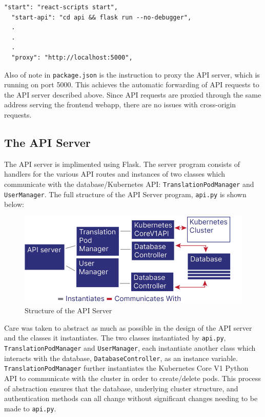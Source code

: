 \documentclass[12pt]{article}
\begin{document}
\begin{lstlisting}[basicstyle=\linespread{0.5}\ttfamily,caption={Frontend/API Server Configuration},captionpos=b]
  "start": "react-scripts start",
  "start-api": "cd api && flask run --no-debugger",
  .
  .
  .
  "proxy": "http://localhost:5000",
\end{lstlisting}

Also of note in \lstinline{package.json} is the instruction to proxy
the API server, which is running on port 5000.  This achieves the
automatic forwarding of API requests to the API server described
above.  Since API requests are proxied through the same address
serving the frontend webapp, there are no issues with cross-origin
requests.

\subsection{The API Server}

The API server is implimented using Flask.  The server program
consists of handlers for the various API routes and instances of two
classes which communicate with the database/Kubernetes API:
\lstinline{TranslationPodManager} and \lstinline{UserManager}.  The
full structure of the API Server program, \lstinline{api.py} is shown
below:

\begin{figure}[h!]

  \includegraphics[scale=1]{api_structure}
  \centering
  \caption{Structure of the API Server}
  \label{rr:detailed}
\end{figure}

Care was taken to abstract as much as possible in the design of the
API server and the classes it instantiates.  The two classes
instantiated by \lstinline{api.py}, \lstinline{TranslationPodManager}
and \lstinline{UserManager}, each instantiate another class which
interacts with the database, \lstinline{DatabaseController}, as an
instance variable.  \lstinline{TranslationPodManager} further
instantiates the Kubernetes Core V1 Python API to communicate with the
cluster in order to create/delete pods.  This process of abstraction
ensures that the database, underlying cluster structure, and
authentication methods can all change without significant changes
needing to be made to \lstinline{api.py}.
\par
\end{document}

